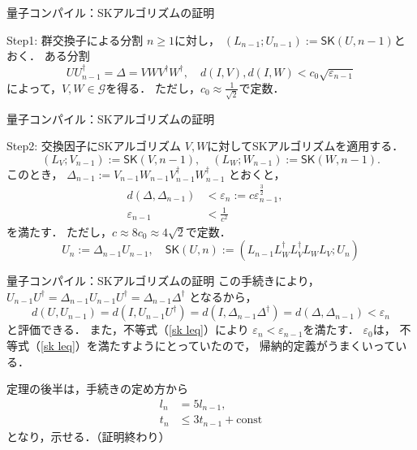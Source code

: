 \documentclass{beamer} %
\renewcommand{\epsilon}{\varepsilon}
\newcommand{\0}{\mathbf{0}}
\newcommand{\1}{\mathbf{1}}
\newcommand{\2}{\mathbf{2}}
\newcommand{\SK}{\mathsf{SK}}
\begin{document}
\begin{frame}{量子コンパイル：SKアルゴリズムの証明}
  \begin{exampleblock}{Step1: 群交換子による分割}
    \(n\geq 1\)に対し，
    \((L_{n-1};U_{n-1}) := \SK(U,n-1)\)とおく．
    ある分割
    \begin{equation*}\label{gc decomp}
      UU_{n-1}^\dagger = \Delta = VWV^\dagger W^\dagger,\quad
      d(I,V),d(I,W) < c_0\sqrt{\epsilon_{n-1}}
    \end{equation*}
    によって，\(V,W\in\mathcal{G}\)を得る．
    ただし，\(c_0\approx\frac{1}{\sqrt{2}}\)で定数．
  \end{exampleblock}
\end{frame}

\begin{frame}{量子コンパイル：SKアルゴリズムの証明}
  \begin{exampleblock}
    {Step2: 交換因子にSKアルゴリズム}
    \(V,W\)に対してSKアルゴリズムを適用する．
    \[
      (L_V;V_{n-1}):=\SK(V,n-1),\quad
      (L_W;W_{n-1}):=\SK(W,n-1).
    \]
    このとき，
    \(\Delta_{n-1}:= V_{n-1}W_{n-1}
    V_{n-1}^\dagger W_{n-1}^\dagger\)
    とおくと，
    \begin{align}
      d(\Delta,\Delta_{n-1})
       & < \epsilon_n
      :=c\epsilon_{n-1}^\frac{3}{2},\quad \\
      \epsilon_{n-1}
       & <\frac{1}{c^{2}} \label{sk leq}
    \end{align}
    を満たす．
    ただし，\(c\approx 8c_0\approx 4\sqrt{2}\)で定数．
    \[
      U_{n}     := \Delta_{n-1} U_{n-1},\quad
      \SK(U,n)  :=(L_{n-1}L_W^\dagger L_V^\dagger L_W L_V;
      U_{n})
    \]
  \end{exampleblock}
\end{frame}

\begin{frame}{量子コンパイル：SKアルゴリズムの証明}
  この手続きにより，
  \(U_{n-1}U^\dagger = \Delta_{n-1}
  U_{n-1}U^\dagger = \Delta_{n-1} \Delta^\dagger\)
  となるから，
  \[
    d(U,U_{n-1})=d(I,U_{n-1}U^\dagger)
    =d(I,\Delta_{n-1}\Delta^\dagger)=d(\Delta,\Delta_{n-1})
    < \epsilon_n
  \]
  と評価できる．
  また，不等式（\ref{sk leq}）により
  \(\epsilon_n < \epsilon_{n-1}\)を満たす．
  \(\epsilon_0\)は，
  不等式（\ref{sk leq}）を満たすようにとっていたので，
  帰納的定義がうまくいっている．

  定理の後半は，手続きの定め方から
  \begin{align*}
    l_n & = 5l_{n-1},                  \\
    t_n & \leq 3t_{n-1} + \text{const}
  \end{align*}
  となり，示せる．（証明終わり）
\end{frame}
\end{document}
